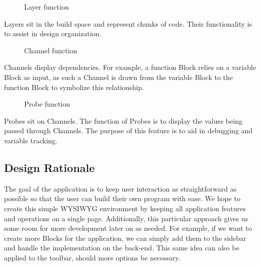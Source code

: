 \documentclass[journal,10pt,onecolumn,compsoc]{IEEEtran} \usepackage[margin=1.0in]{geometry} \usepackage{pdfpages}
\begin{document}
\begin{figure}[H]
\centering
{}
\caption{Layer function}
\end{figure}

\noindent Layers sit in the build space and represent chunks of code.
Their functionality is to assist in design organization.

\begin{figure}[H]
\centering
{}
\caption{Channel function}
\end{figure}

\noindent Channels display dependencies. 
For example, a function Block relies on a variable Block as input, as such a Channel is drawn from the variable Block to the function Block to symbolize this relationship. 

\begin{figure}[H]
\centering
{}
\caption{Probe function}
\end{figure}

\noindent Probes sit on Channels. 
The function of Probes is to display the values being passed through Channels.
The purpose of this feature is to aid in debugging and variable tracking.
\subsection{Design Rationale}
\noindent The goal of the application is to keep user interaction as straightforward as possible so that the user can build their own program with ease. 
We hope to create this simple WYSIWYG environment by keeping all application features and operations on a single page. 
Additionally, this particular approach gives us some room for more development later on as needed. 
For example, if we want to create more Blocks for the application, we can simply add them to the sidebar and handle the implementation on the back-end. 
This same idea can also be applied to the toolbar, should more options be necessary.
\end{document}
